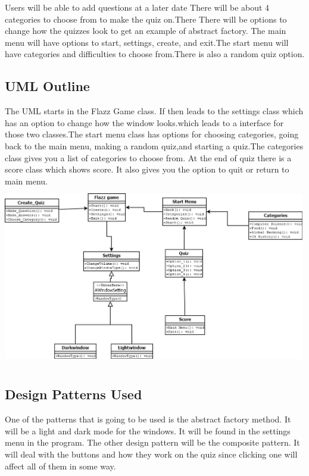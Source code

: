 \documentclass[10pt,conference,onecolumn,compsoc]{IEEEtran}
\begin{document}
 	Users will be able to add questions at a later date  There will be about 4 categories to choose from to make the quiz on.There There will be options to change how the quizzes look to get an example of abstract factory. The main menu will have options to start, settings, create, and exit.The start menu will have categories and difficulties to choose from.There is also a random quiz option.

\subsection{UML Outline}
The UML starts in the Flazz Game class. If then leads to the settings class which has an option to change how the window looks.which leads to a interface for those two classes.The start menu class has options for choosing categories, going back to the main menu, making a random quiz,and starting a quiz.The categories class gives you a list of categories to choose from. At the end of quiz there is a score class which shows score. It also  gives you the option to quit or return to main menu.
\includegraphics[height=300px, width=500px]{Flazz Game1.png}






\subsection{Design Patterns Used}
One of the patterns that is going to be used is the abstract factory method. It will be a light and dark mode for the windows. It will be found in the settings menu in the program.
The other design pattern will be the composite pattern. It will deal with the buttons and how they work on the quiz since clicking one will affect all of them in some way.
\end{document}
